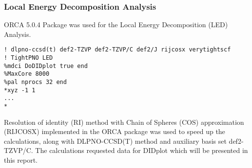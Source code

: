 \subsubsection{Local Energy Decomposition Analysis}
ORCA 5.0.4 Package was used for the Local Energy Decomposition (LED) Analysis.

\begin{verbatim}
! dlpno-ccsd(t) def2-TZVP def2-TZVP/C def2/J rijcosx verytightscf 
! TightPNO LED
%mdci DoDIDplot true end
%MaxCore 8000
%pal nprocs 32 end
*xyz -1 1
... 
*
\end{verbatim}

Resolution of identity (RI) method with Chain of Spheres (COS) approximation (RIJCOSX) implemented in the ORCA package was used to speed up the calculations,
along with DLPNO-CCSD(T) method and auxiliary basis set def2-TZVP/C.
The calculations requested data for DIDplot which will be presented in this report.
